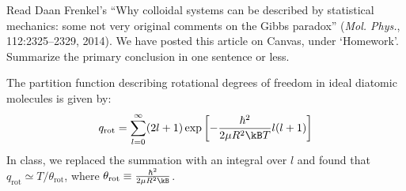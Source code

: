 Read Daan Frenkel's
``Why colloidal systems can
be described by statistical mechanics:
some not very original comments on
the Gibbs paradox'' ({\sl Mol. Phys.},
112:2325--2329, 2014).
We have posted this article on Canvas, under `Homework'.
Summarize the primary conclusion in one sentence or less.

\bigskip
{}
The partition function describing rotational degrees of freedom
in ideal diatomic molecules is given by:
\begin{equation}
q_\text{rot} = 
\sum_{l=0}^\infty (2l+1) \exp\left[-\frac{\hbar^2}{2\mu R^2 \kB T}l(l+1)\right] 
\label{eq:qrot}
\end{equation}
In class, we replaced the summation with an integral over $l$
and found that $q_\text{rot} \simeq T/\theta_\text{rot}$,
where $\theta_\text{rot} \equiv \frac{\hbar^2}{2\mu R^2 \kB}$.

